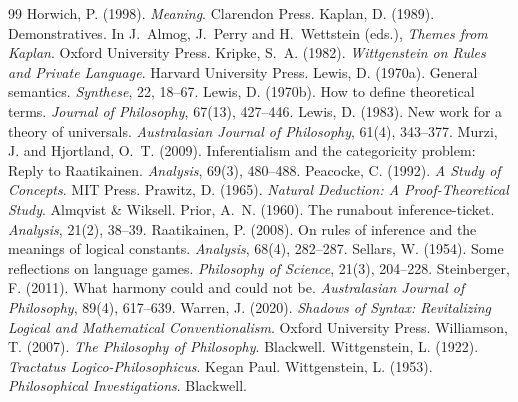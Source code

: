 \documentclass{situationist-preprint}
\begin{document}
\begin{thebibliography}{99}
 Horwich, P. (1998). \emph{Meaning}. Clarendon Press.
 Kaplan, D. (1989). Demonstratives. In J.~Almog, J.~Perry and H.~Wettstein (eds.), \emph{Themes from Kaplan}. Oxford University Press.
 Kripke, S.~A. (1982). \emph{Wittgenstein on Rules and Private Language}. Harvard University Press.
 Lewis, D. (1970a). General semantics. \emph{Synthese}, 22, 18--67.
 Lewis, D. (1970b). How to define theoretical terms. \emph{Journal of Philosophy}, 67(13), 427--446.
 Lewis, D. (1983). New work for a theory of universals. \emph{Australasian Journal of Philosophy}, 61(4), 343--377.
 Murzi, J. and Hjortland, O.~T. (2009). Inferentialism and the categoricity problem: Reply to Raatikainen. \emph{Analysis}, 69(3), 480--488.
 Peacocke, C. (1992). \emph{A Study of Concepts}. MIT Press.
 Prawitz, D. (1965). \emph{Natural Deduction: A Proof-Theoretical Study}. Almqvist \& Wiksell.
 Prior, A.~N. (1960). The runabout inference-ticket. \emph{Analysis}, 21(2), 38--39.
 Raatikainen, P. (2008). On rules of inference and the meanings of logical constants. \emph{Analysis}, 68(4), 282--287.
 Sellars, W. (1954). Some reflections on language games. \emph{Philosophy of Science}, 21(3), 204--228.
 Steinberger, F. (2011). What harmony could and could not be. \emph{Australasian Journal of Philosophy}, 89(4), 617--639.
 Warren, J. (2020). \emph{Shadows of Syntax: Revitalizing Logical and Mathematical Conventionalism}. Oxford University Press.
 Williamson, T. (2007). \emph{The Philosophy of Philosophy}. Blackwell.
 Wittgenstein, L. (1922). \emph{Tractatus Logico-Philosophicus}. Kegan Paul.
 Wittgenstein, L. (1953). \emph{Philosophical Investigations}. Blackwell.
\end{thebibliography}
\end{document}
